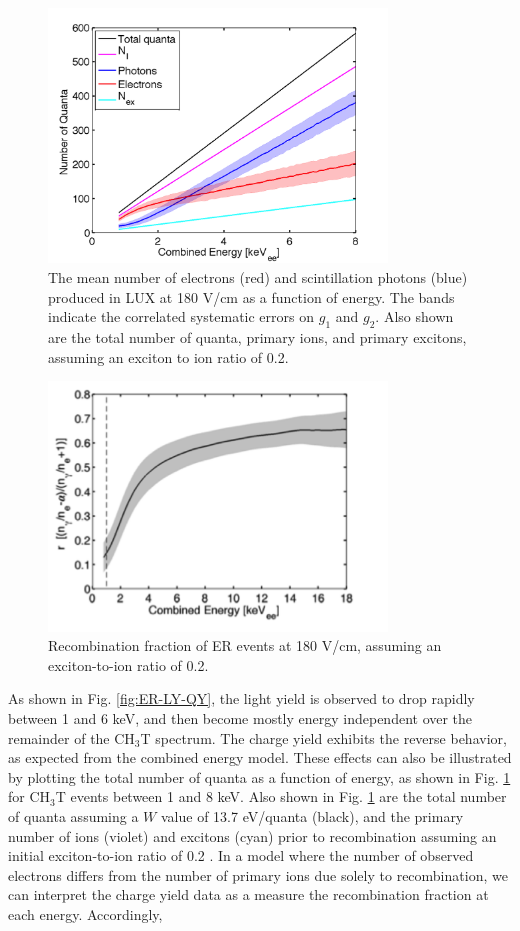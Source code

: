 \begin{figure}[h!]\centering
\includegraphics[width=90mm]{fig/quanta-vs-energy.png}
\caption{The mean number of electrons (red) and scintillation photons (blue) produced in LUX at 180 V/cm as a function of energy. The bands indicate the correlated systematic errors on $g_1$ and $g_2$. Also shown are the total number of quanta, primary ions, and primary excitons, assuming an exciton to ion ratio of 0.2. }
\label{fig:quanta-vs-energy}
\end{figure}


\begin{figure}[h!]\centering
\includegraphics[width=90mm]{fig/recombination.png}
\caption{Recombination fraction of ER events at 180 V/cm, assuming an exciton-to-ion ratio of 0.2.}
\label{fig:recombination}
\end{figure}


As shown in Fig. \ref{fig:ER-LY-QY}, the light yield is observed to drop rapidly between 1 and 6 keV, and then become mostly energy independent over the remainder of the CH$_3$T spectrum. The charge yield exhibits the reverse behavior, as expected from the combined energy model. These effects can also be illustrated by plotting the total number of quanta as a function of energy, as shown in Fig. \ref{fig:quanta-vs-energy} for CH$_3$T events between 1 and 8 keV. Also shown in Fig. \ref{fig:quanta-vs-energy} are the total number of quanta assuming a $W$ value of 13.7 eV/quanta (black), and the primary number of ions (violet) and excitons (cyan) prior to recombination assuming an initial exciton-to-ion ratio of 0.2 \cite{XXXX}. In a model where the number of observed electrons differs from the number of primary ions due solely to recombination, we can interpret the charge yield data as a measure the recombination fraction at each energy. Accordingly, 

